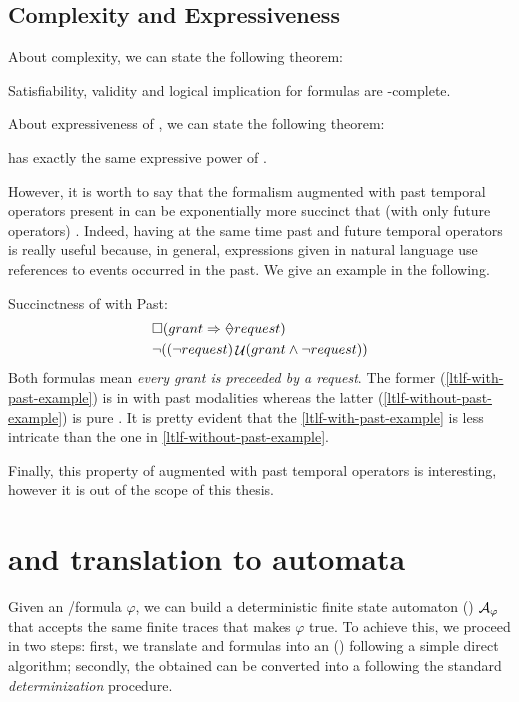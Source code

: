 \subsection{Complexity and Expressiveness}
About \PLTL complexity, we can state the following theorem:
\begin{theorem}
Satisfiability, validity and logical implication for \PLTL formulas are \PSPACE-complete.
\end{theorem}

\noindent About expressiveness of \PLTL, we can state the following theorem:
\begin{theorem}
\PLTL has exactly the same expressive power of \LTLf.
\end{theorem}

\noindent However, it is worth to say that the \LTLf formalism augmented with past temporal operators present in \PLTL can be exponentially more succinct that \LTLf (with only future operators) \citep{markey2003temporal}.
Indeed, having at the same time past and future temporal operators is really useful because, in general, expressions given in natural language use references to events occurred in the past. We give an example in the following.
\begin{example}\label{succinctness-example}
Succinctness of \LTLf with Past:
\begin{align}
&\Box(grant \Rightarrow \Once request)\label{ltlf-with-past-example}\\
&\lnot((\lnot request) \lUntil (grant \lAND \lnot request))\label{ltlf-without-past-example}
\end{align}
Both formulas mean \emph{every grant is preceeded by a request}. The  former (\ref{ltlf-with-past-example}) is in \LTLf with past modalities whereas the latter (\ref{ltlf-without-past-example}) is pure \LTLf. It is pretty evident that the \ref{ltlf-with-past-example} is less intricate than the one in \ref{ltlf-without-past-example}.
\end{example}
Finally, this property of \LTLf augmented with past temporal operators is interesting, however it is out of the scope of this thesis.
\section{\LTLf and \PLTL translation to  automata}\label{sec:formula-to-automa}
Given an \LTLf/\PLTL formula $\varphi$, we can build a deterministic finite state automaton (\DFA) \citep{Rabin:1959:FAD:1661907.1661909} 
$\mathcal{A}_\varphi$ that accepts the same finite traces that makes $\varphi$ true. To achieve this, we proceed in two steps: first, we translate \LTLf and \PLTL formulas into an (\NFA) \citep{DeGiacomo:2015:SLL:2832415.2832466} following a simple direct algorithm; secondly, the obtained \NFA can be converted into a \DFA following the standard \emph{determinization}  procedure.

